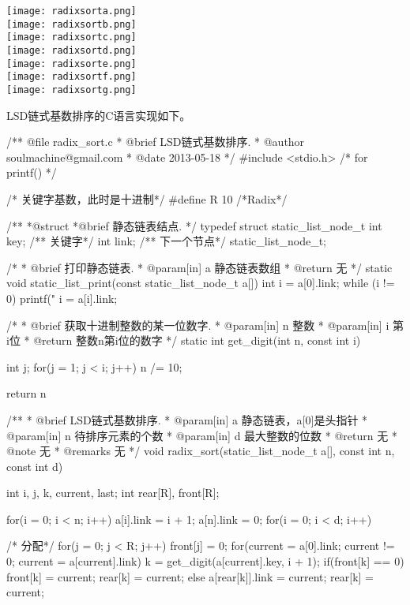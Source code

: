 \begin{center}
\texttt{[image: radixsorta.png]}\\
\texttt{[image: radixsortb.png]}\\
\texttt{[image: radixsortc.png]}\\
\texttt{[image: radixsortd.png]}\\
\texttt{[image: radixsorte.png]}\\
\texttt{[image: radixsortf.png]}\\
\texttt{[image: radixsortg.png]}\\
\label{fig:radixsort}
\end{center}

LSD链式基数排序的C语言实现如下。
\begin{Codex}[label=radix_sort.c]
/** @file radix_sort.c
  * @brief LSD链式基数排序.
  * @author soulmachine@gmail.com
  * @date 2013-05-18
  */
#include <stdio.h>  /* for printf() */

/* 关键字基数，此时是十进制*/
#define R 10  /*Radix*/

/**
  *@struct
  *@brief 静态链表结点.
  */
typedef struct static_list_node_t {
    int key; /** 关键字*/
    int link; /** 下一个节点*/
}static_list_node_t;

 /*
  * @brief 打印静态链表.
  * @param[in] a 静态链表数组
  * @return 无
  */
static void static_list_print(const static_list_node_t a[]) {
    int i = a[0].link;
    while (i != 0) {
        printf("%
        i = a[i].link;
    }
}

 /*
  * @brief 获取十进制整数的某一位数字.
  * @param[in] n 整数
  * @param[in] i 第i位
  * @return 整数n第i位的数字
  */
static int get_digit(int n, const int i) {
    int j;
    for(j = 1; j < i; j++) {
        n /= 10;
    }

    return n %
}

/**
  * @brief LSD链式基数排序.
  * @param[in] a 静态链表，a[0]是头指针
  * @param[in] n 待排序元素的个数
  * @param[in] d 最大整数的位数
  * @return 无
  * @note 无
  * @remarks 无
  */
void radix_sort(static_list_node_t a[], const int n, const int d) {
    int i, j, k, current, last;
    int rear[R], front[R];

    for(i = 0; i < n; i++) a[i].link = i + 1;
    a[n].link = 0;
    for(i = 0; i < d; i++) {
        /* 分配*/
        for(j = 0; j < R; j++) front[j] = 0;
        for(current = a[0].link; current != 0;
            current = a[current].link) {
            k = get_digit(a[current].key, i + 1);
            if(front[k] == 0) {
                front[k] = current;
                rear[k] = current;
            } else {
                a[rear[k]].link = current;
                rear[k] = current;
            }
        }

}}
\end{Codex}

